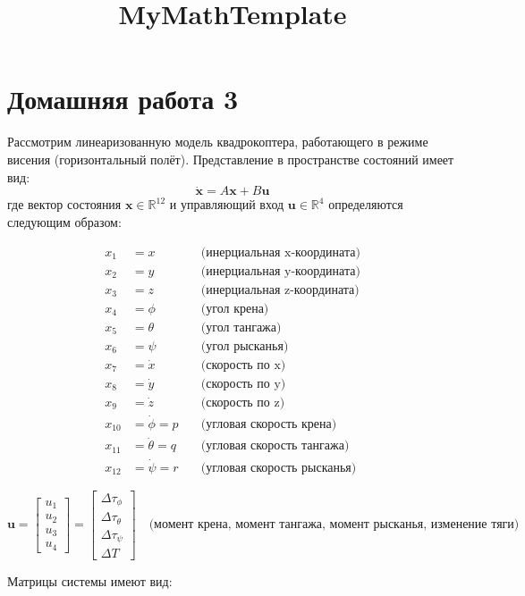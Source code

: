 \documentclass[8pt]{article}
\title{MyMathTemplate}
\begin{document}
\section*{Домашняя работа 3 }
Рассмотрим линеаризованную модель квадрокоптера, работающего в режиме висения (горизонтальный полёт). Представление в пространстве состояний имеет вид:
\[
\dot{\mathbf{x}} = A\mathbf{x} + B\mathbf{u}
\]
где вектор состояния \(\mathbf{x} \in \mathbb{R}^{12}\) и управляющий вход \(\mathbf{u} \in \mathbb{R}^4\) определяются следующим образом:

\[
\begin{aligned}
x_1 &= x \quad &\text{(инерциальная x-координата)} \\
x_2 &= y \quad &\text{(инерциальная y-координата)} \\
x_3 &= z \quad &\text{(инерциальная z-координата)} \\
x_4 &= \phi \quad &\text{(угол крена)} \\
x_5 &= \theta \quad &\text{(угол тангажа)} \\
x_6 &= \psi \quad &\text{(угол рысканья)} \\
x_7 &= \dot{x} \quad &\text{(скорость по x)} \\
x_8 &= \dot{y} \quad &\text{(скорость по y)} \\
x_9 &= \dot{z} \quad &\text{(скорость по z)} \\
x_{10} &= \dot{\phi} = p \quad &\text{(угловая скорость крена)} \\
x_{11} &= \dot{\theta} = q \quad &\text{(угловая скорость тангажа)} \\
x_{12} &= \dot{\psi} = r \quad &\text{(угловая скорость рысканья)}
\end{aligned}
\]

\[
\mathbf{u} = \begin{bmatrix} u_1 \\ u_2 \\ u_3 \\ u_4 \end{bmatrix} = \begin{bmatrix} \Delta\tau_\phi \\ \Delta\tau_\theta \\ \Delta\tau_\psi \\ \Delta T \end{bmatrix} \quad \text{(момент крена, момент тангажа, момент рысканья, изменение тяги)}
\]

Матрицы системы имеют вид:
\end{document}
